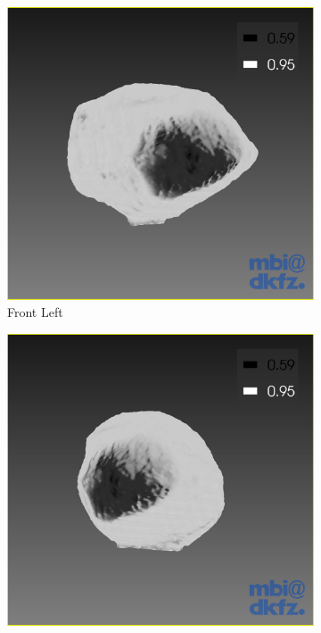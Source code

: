 \begin{figure}[h]
\begin{subfigure}[b]{0.20\textwidth}
    \includegraphics[width=\textwidth]{images/surface/surface_180_2.png}
    \caption*{Front Left}
    \label{fig:surface_front_left}
  \end{subfigure}%
  \begin{subfigure}[b]{0.20\textwidth}
    \includegraphics[width=\textwidth]{images/surface/surface_180_3.png}

\end{subfigure}
\end{figure}
